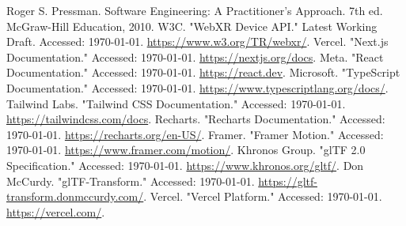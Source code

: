 \documentclass[12pt,a4paper,oneside]{report}
\begin{document}
\clearpage
\renewcommand\refname{References}
\begin{thebibliography}{99}
\setlength{\itemsep}{\baselineskip} %
\setlength{\parsep}{0pt}
\setlength{\parskip}{0pt}
\small %
 Roger S. Pressman. Software Engineering: A Practitioner’s Approach. 7th ed. McGraw-Hill Education, 2010.
 W3C. "WebXR Device API." Latest Working Draft. Accessed: \today. \url{https://www.w3.org/TR/webxr/}.
 Vercel. "Next.js Documentation." Accessed: \today. \url{https://nextjs.org/docs}.
 Meta. "React Documentation." Accessed: \today. \url{https://react.dev}.
 Microsoft. "TypeScript Documentation." Accessed: \today. \url{https://www.typescriptlang.org/docs/}.
 Tailwind Labs. "Tailwind CSS Documentation." Accessed: \today. \url{https://tailwindcss.com/docs}.
 Recharts. "Recharts Documentation." Accessed: \today. \url{https://recharts.org/en-US/}.
 Framer. "Framer Motion." Accessed: \today. \url{https://www.framer.com/motion/}.
 Khronos Group. "glTF 2.0 Specification." Accessed: \today. \url{https://www.khronos.org/gltf/}.
 Don McCurdy. "glTF-Transform." Accessed: \today. \url{https://gltf-transform.donmccurdy.com/}.
 Vercel. "Vercel Platform." Accessed: \today. \url{https://vercel.com/}.
\end{thebibliography}
\end{document}
